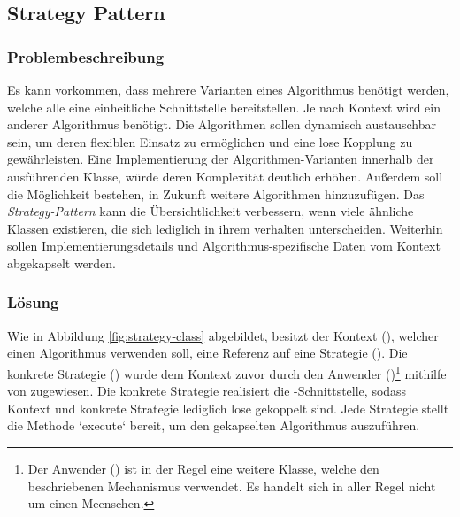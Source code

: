 \subsection{Strategy Pattern}

\subsubsection*{Problembeschreibung}

Es kann vorkommen, dass mehrere Varianten eines Algorithmus benötigt werden, welche alle eine einheitliche Schnittstelle bereitstellen. Je nach Kontext wird ein anderer Algorithmus benötigt. Die Algorithmen sollen dynamisch austauschbar sein, um deren flexiblen Einsatz zu ermöglichen und eine lose Kopplung zu gewährleisten. Eine Implementierung der Algorithmen-Varianten innerhalb der ausführenden Klasse, würde deren Komplexität deutlich erhöhen. Außerdem soll die Möglichkeit bestehen, in Zukunft weitere Algorithmen hinzuzufügen. Das \emph{Strategy-Pattern} kann die Übersichtlichkeit verbessern, wenn viele ähnliche Klassen existieren, die sich lediglich in ihrem verhalten unterscheiden. Weiterhin sollen Implementierungsdetails und Algorithmus-spezifische Daten vom Kontext abgekapselt werden. \cite{gamma_design_1995}

\subsubsection*{Lösung}

Wie in Abbildung \ref{fig:strategy-class} abgebildet, besitzt der Kontext (), welcher einen Algorithmus verwenden soll, eine Referenz auf eine Strategie (). Die konkrete Strategie () wurde dem Kontext zuvor durch den Anwender ()\footnote{Der Anwender () ist in der Regel eine weitere Klasse, welche den beschriebenen Mechanismus verwendet. Es handelt sich in aller Regel nicht um einen Meenschen.} mithilfe von  zugewiesen. Die konkrete Strategie realisiert die -Schnittstelle, sodass Kontext und konkrete Strategie lediglich lose gekoppelt sind. Jede Strategie stellt die Methode `execute` bereit, um den gekapselten Algorithmus auszuführen.

